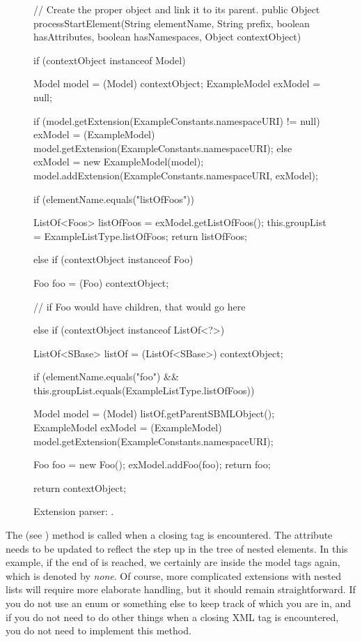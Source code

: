 \begin{figure}[tb]
  \begin{example}
// Create the proper object and link it to its parent.
public Object processStartElement(String elementName, String prefix,
    boolean hasAttributes, boolean hasNamespaces, Object contextObject) {

  if (contextObject instanceof Model) {
    Model model = (Model) contextObject;
    ExampleModel exModel = null;

    if (model.getExtension(ExampleConstants.namespaceURI) != null) {
      exModel = (ExampleModel) model.getExtension(ExampleConstants.namespaceURI);
    } else {
      exModel = new ExampleModel(model);
      model.addExtension(ExampleConstants.namespaceURI, exModel);
    }

    if (elementName.equals("listOfFoos")) {

      ListOf<Foos> listOfFoos = exModel.getListOfFoos();
      this.groupList = ExampleListType.listOfFoos;
      return listOfFoos;
    }
  } else if (contextObject instanceof Foo) {
    Foo foo = (Foo) contextObject;

    // if Foo would have children, that would go here

  }
  else if (contextObject instanceof ListOf<?>) {
    ListOf<SBase> listOf = (ListOf<SBase>) contextObject;

    if (elementName.equals("foo") && this.groupList.equals(ExampleListType.listOfFoos)) {
      Model model = (Model) listOf.getParentSBMLObject();
      ExampleModel exModel = (ExampleModel) model.getExtension(ExampleConstants.namespaceURI);

      Foo foo = new Foo();
      exModel.addFoo(foo);
      return foo;
    }
  }
  return contextObject;
}\end{example}
  \caption{Extension parser: .}
  \label{lst:ModelExtParserStartElement}
\end{figure}

The  (see ) 
method is called when a closing tag is
encountered.  The  attribute needs to be updated to reflect the step
up in the tree of nested elements.  In this example, if the end of
 is reached, we certainly are inside the model tags
again, which is denoted by \emph{none}.  Of course, more complicated
extensions with nested lists will require more elaborate handling, but it
should remain straightforward. If you do not use an enum or something else to
keep track of which  you are in, and if you do not need to do other
things when a closing XML tag is encountered, you do not need to implement this method.

